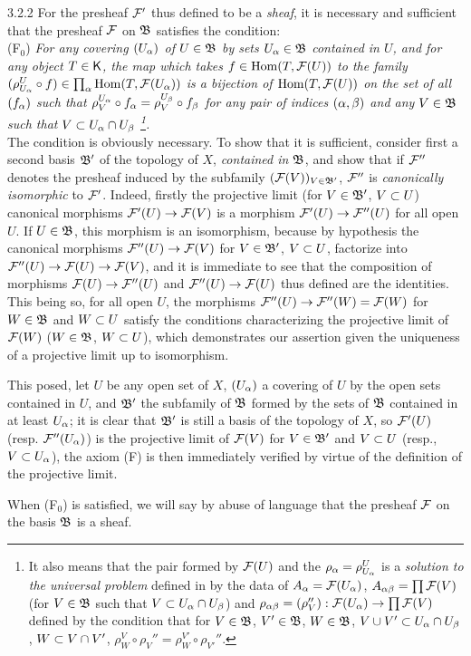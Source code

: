 \documentclass[../main.tex]{subfiles}
\begin{document}
\begin{env}{3.2.2}
For the presheaf $\mathcal{F}'$ thus defined to be a \emph{sheaf}, it is necessary and sufficient
that the presheaf $\mathcal{F}$ on $\mathfrak{B}$ satisfies the condition:\\

  (F$_0$) \emph{For any covering $(U_\alpha)$ of $U\in\mathfrak{B}$ by sets $U_\alpha\in\mathfrak{B}$
  contained in $U$, and for any object $T\in\mathsf{K}$, the map which takes $f\in\operatorname{Hom}(T,\mathcal{F}(U))$
  to the family $(\rho_{U_\alpha}^U\circ f)\in\prod_\alpha\operatorname{Hom}(T,\mathcal{F}(U_\alpha))$ is a bijection of
  $\operatorname{Hom}(T,\mathcal{F}(U))$ on the set of all $(f_\alpha)$ such that $\rho_V^{U_\alpha}\circ f_\alpha=\rho_V^{U_\beta}\circ f_\beta$
  for any pair of indices $(\alpha,\beta)$ and any $V\in\mathfrak{B}$ such that $V\subset U_\alpha\cap U_\beta$
  \footnote{It also means that the pair formed by $\mathcal{F}(U)$ and the $\rho_\alpha=\rho_{U_\alpha}^U$
  is a \emph{solution to the universal problem} defined in  by the data of $A_\alpha=\mathcal{F}(U_\alpha)$,
  $A_{\alpha\beta}=\prod\mathcal{F}(V)$ (for $V\in\mathfrak{B}$ such that $V\subset U_\alpha\cap U_\beta$) and
  $\rho_{\alpha\beta}=(\rho_V''):\mathcal{F}(U_\alpha)\to\prod\mathcal{F}(V)$ defined by the condition that for
  $V\in\mathfrak{B}$, $V'\in\mathfrak{B}$, $W\in\mathfrak{B}$, $V\cup V'\subset U_\alpha\cap U_\beta$,
  $W\subset V\cap V'$, $\rho_W^V\circ\rho_V''=\rho_W^{V'}\circ\rho_{V'}''$.}.}\\

The condition is obviously necessary. To show that it is sufficient,
consider first a second basis $\mathfrak{B}'$ of the topology of $X$, \emph{contained in} $\mathfrak{B}$, and
show that if $\mathcal{F}''$ denotes the presheaf induced by the subfamily $(\mathcal{F}(V))_{V\in\mathfrak{B}'}$, $\mathcal{F}''$ is
\emph{canonically isomorphic} to $\mathcal{F}'$. Indeed, firstly the projective limit (for $V\in\mathfrak{B}'$,
$V\subset U$) canonical morphisms ${\mathcal{F}'(U)\to\mathcal{F}(V)}$ is a morphism ${\mathcal{F}'(U)\to\mathcal{F}''(U)}$
for all open $U$. If $U\in\mathfrak{B}$, this morphism is an isomorphism, because by hypothesis
the canonical morphisms ${\mathcal{F}''(U)\to\mathcal{F}(V)}$ for $V\in\mathfrak{B}'$, $V\subset U$, factorize into
${\mathcal{F}''(U)\to\mathcal{F}(U)\to\mathcal{F}(V)}$, and it is immediate to see that the composition of morphisms
${\mathcal{F}(U)\to\mathcal{F}''(U)}$ and ${\mathcal{F}''(U)\to\mathcal{F}(U)}$ thus defined are the identities. This being so, for
all open $U$, the morphisms ${\mathcal{F}''(U)\to\mathcal{F}''(W)=\mathcal{F}(W)}$ for $W\in\mathfrak{B}$ and $W\subset U$ satisfy
the conditions characterizing the projective limit of $\mathcal{F}(W)$ ($W\in\mathfrak{B}$, $W\subset U$), which demonstrates
our assertion given the uniqueness of a projective limit up to isomorphism.

This posed, let $U$ be any open set of $X$, $(U_\alpha)$ a covering of $U$ by
the open sets contained in $U$, and $\mathfrak{B}'$ the subfamily of $\mathfrak{B}$ formed by the sets
of $\mathfrak{B}$ contained in at least $U_\alpha$; it is clear that $\mathfrak{B}'$ is still a basis
of the topology of $X$, so $\mathcal{F}'(U)$ (resp. $\mathcal{F}''(U_\alpha)$) is the projective limit of $\mathcal{F}(V)$ for $V\in\mathfrak{B}'$
and $V\subset U$ (resp., $V\subset U_\alpha$), the axiom (F) is then immediately verified by virtue of the definition of the
projective limit.

When (F$_0$) is satisfied, we will say by abuse of language that the presheaf $\mathcal{F}$
on the basis $\mathfrak{B}$ is a sheaf.
\end{env}
\end{document}
